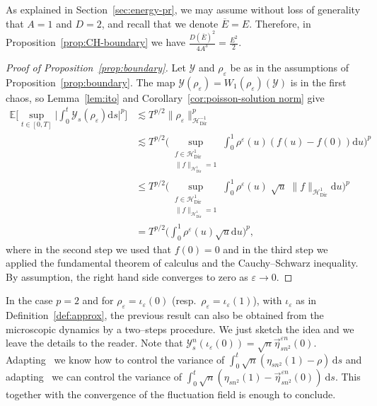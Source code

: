 \documentclass[AHL,Unicode,longabstracts]{cedram}
\DeclareMathOperator{\Dir}{Dir}
\newcommand{\mc}[1]{{\mathcal #1}}
\renewcommand{\mc}[1]{{\mathcal #1}}
\renewcommand\vec[1]{\overrightarrow{#1}}
\renewcommand{\bar}{\overline}
\renewcommand{\le}{\leqslant}
\newcommand*{\dd}{\mathrm{d}}
\newcommand*{\ds}{\dd s}
\newcommand*{\du}{\dd u}
\begin{document}
As explained in Section~\ref{sec:energy-pr}, we may assume without loss of generality that $A=1$ and $D=2$, and recall that we denote $\bar E=E$. Therefore, in Proposition~\ref{prop:CH-boundary} we have $\frac{D(\bar E)^2}{4A^3}=\frac{E^2}{2}$.

\begin{proof}[Proof of Proposition~\ref{prop:boundary}] Let $\mc Y$ and $\rho_\varepsilon$ be as in the assumptions of Proposition~\ref{prop:boundary}.
The map $\mc Y(\rho_\varepsilon) = W_1 (\rho_\varepsilon) (\mc Y)$ is in the first chaos, so Lemma~\ref{lem:ito} and Corollary~\ref{cor:poisson-solution norm} give
\begin{align*}
\mathbb{E} \bigg[\sup_{t \in [0,T]}
\bigg| \int_0^t \mc Y_s (\rho_{\varepsilon}) \ds \bigg|^p \bigg] & \lesssim T^{p / 2} \big\| \rho_{\varepsilon}
\big\|_{\mc H_{\Dir}^{- 1}}^p \\
& \lesssim T^{p / 2} \Bigg(\sup_{\substack{f \in \mc H_{\Dir}^1\\ \| f\|_{\mc H_{\Dir}^{1}}=1}} \int_0^1 \rho^\varepsilon(u) (f(u) -f(0)) \du \Bigg)^p\\
& \le T^{p / 2} \Bigg(\sup_{\substack{f \in \mc H_{\Dir}^1\\ \| f\|_{\mc H_{\Dir}^{1}}=1}} \int_0^1 \rho^\varepsilon(u) \; \sqrt u \; \|f\|_{\mc H_{\Dir}^{1}} \du \Bigg)^p \\
& = T^{p / 2} \bigg(\int_0^1 \rho^\varepsilon(u) \sqrt u \du\bigg)^p,
\end{align*}
where in the second step we used that $f(0)=0$ and in the third step we applied the fundamental theorem of calculus and the Cauchy--Schwarz inequality. By assumption, the right hand side converges to zero as $\varepsilon \to 0$.
\end{proof}

\begin{rema}
In the case $p=2$ and for $\rho_\varepsilon = \iota_{\varepsilon}(0)$ (resp.~$\rho_\varepsilon = \iota_\varepsilon(1)$), with $\iota_\varepsilon$ as in Definition~\ref{def:approx}, the previous result can also be obtained from the microscopic dynamics by a two--steps procedure. We just sketch the idea and we leave the details to the reader. Note that $\mathcal{Y}_s^n(\iota_{\varepsilon}(0))=\sqrt n \vec\eta_{sn^2}^{\varepsilon n}(0)$. Adapting~\cite[Lemma~3]{Franco2016} we know how to control the variance of $\int_0^t \sqrt n (\eta_{sn^2}(1)-\rho) \, \ds$ and adapting~\cite[Lemma~7.1]{FRANCO20134156} we can control the variance of $\int_0^t \sqrt n (\eta_{sn^2}(1)-\vec\eta_{sn^2}^{\varepsilon n}(0))\ \ds$. This together with the convergence of the fluctuation field is enough to conclude.
\end{rema}
\end{document}
